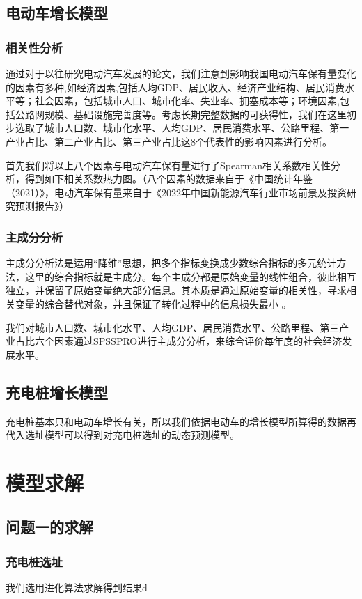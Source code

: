 \documentclass[12pt, a4paper, oneside]{ctexart}
\begin{document}
    \subsection{电动车增长模型}
    \subsubsection{相关性分析}
    通过对于以往研究电动汽车发展的论文，我们注意到影响我国电动汽车保有量变化的因素有多种,如经济因素,包括人均GDP、居民收入、经济产业结构、居民消费水平等；社会因素，包括城市人口、城市化率、失业率、拥塞成本等；环境因素,包括公路网规模、基础设施完善度等。考虑长期完整数据的可获得性，我们在这里初步选取了城市人口数、城市化水平、人均GDP、居民消费水平、公路里程、第一产业占比、第二产业占比、第三产业占比这8个代表性的影响因素进行分析。

    首先我们将以上八个因素与电动汽车保有量进行了Spearman相关系数相关性分析，得到如下相关系数热力图。（八个因素的数据来自于《中国统计年鉴（2021）》\cite{cite:统计年鉴}，电动汽车保有量来自于《2022年中国新能源汽车行业市场前景及投资研究预测报告》\cite{cite:预测报告}）
    \subsubsection{主成分分析}
    主成分分析法是运用“降维”思想，把多个指标变换成少数综合指标的多元统计方法，这里的综合指标就是主成分。每个主成分都是原始变量的线性组合，彼此相互独立，并保留了原始变量绝大部分信息。其本质是通过原始变量的相关性，寻求相关变量的综合替代对象，并且保证了转化过程中的信息损失最小 。

    我们对城市人口数、城市化水平、人均GDP、居民消费水平、公路里程、第三产业占比六个因素通过SPSSPRO进行主成分分析，来综合评价每年度的社会经济发展水平。
    
    \subsection{充电桩增长模型}
    充电桩基本只和电动车增长有关，所以我们依据电动车的增长模型所算得的数据再代入选址模型可以得到对充电桩选址的动态预测模型。
    \section{模型求解}
    \subsection{问题一的求解}
    \subsubsection{充电桩选址}
    我们选用进化算法求解得到结果d
\end{document}

